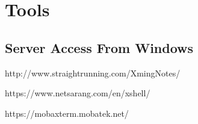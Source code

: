 \chapter{Tools}
\label{chap:Tools}

\section{Server Access From Windows}
\label{sec:ServerAccessFromWindows}

http://www.straightrunning.com/XmingNotes/

https://www.netsarang.com/en/xshell/

https://mobaxterm.mobatek.net/ 